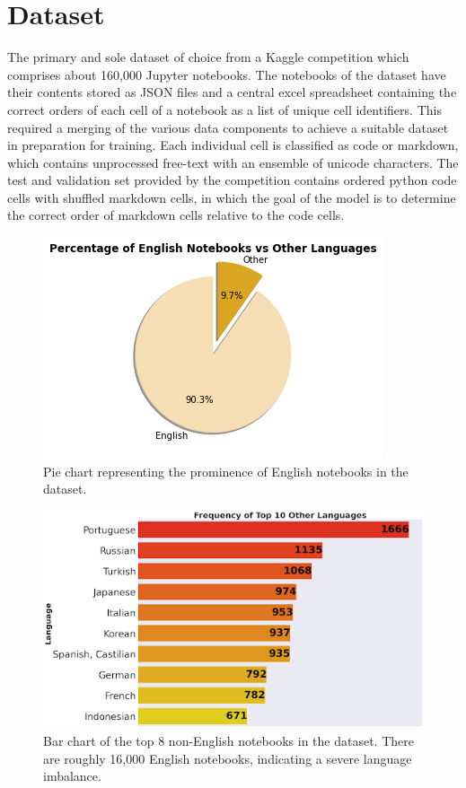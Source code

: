 \documentclass[conference]{IEEEtran}
\begin{document}
\section{Dataset}
The primary and sole dataset of choice from a Kaggle competition which comprises about 160,000 Jupyter notebooks. The notebooks of the dataset have their contents stored as JSON files and a central excel spreadsheet containing the correct orders of each cell of a notebook as a list of unique cell identifiers. This required a merging of the various data components to achieve a suitable dataset in preparation for training. Each individual cell is classified as code or markdown, which contains unprocessed free-text with an ensemble of unicode characters. The test and validation set provided by the competition contains ordered python code cells with shuffled markdown cells, in which the goal of the model is to determine the correct order of markdown cells relative to the code cells.

\begin{figure}[h]
  \centering
  \includegraphics[width=\linewidth]{eng_percent}
  \caption{Pie chart representing the prominence of English notebooks in the dataset.}
\end{figure}

\begin{figure}[h]
  \centering
  \includegraphics[width=\linewidth]{freq}
  \caption{Bar chart of the top 8 non-English notebooks in the dataset. There are roughly 16,000 English notebooks, indicating a severe language imbalance.}
\end{figure}
\end{document}
